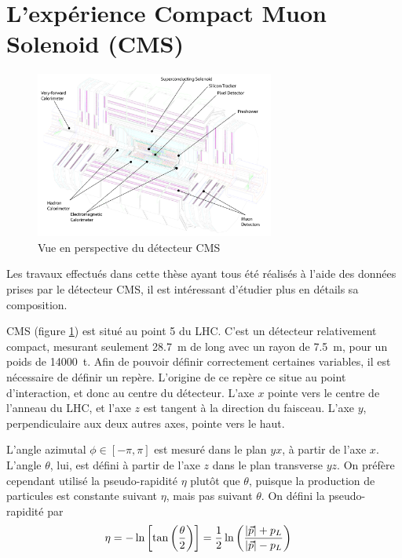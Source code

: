 % 

\section{L'expérience Compact Muon Solenoid (CMS)}

\begin{figure} \centering
  \includegraphics[width=0.7\textwidth]{chapitre2/figs/CMS_2.pdf}
  \caption{Vue en perspective du détecteur CMS}
  \label{fig:cms}
\end{figure}

Les travaux effectués dans cette thèse ayant tous été réalisés à l'aide des données prises par le détecteur CMS, il est intéressant d'étudier plus en détails sa composition.

\bigskip

CMS (figure \ref{fig:cms}) est situé au point 5 du LHC. C'est un détecteur relativement compact, mesurant seulement \SI{28.7}{\m} de long avec un rayon de \SI{7.5}{\m}, pour un poids de \SI{14000}{\tonne}. Afin de pouvoir définir correctement certaines variables, il est nécessaire de définir un repère. L'origine de ce repère ce situe au point d'interaction, et donc au centre du détecteur. L'axe $x$ pointe vers le centre de l'anneau du LHC, et l'axe $z$ est tangent à la direction du faisceau. L'axe $y$, perpendiculaire aux deux autres axes, pointe vers le haut.

L'angle azimutal $\phi \in \left[-\pi, \pi\right]$ est mesuré dans le plan $yx$, à partir de l'axe $x$. L'angle $\theta$, lui, est défini à partir de l'axe $z$ dans le plan transverse $yz$. On préfère cependant utilisé la pseudo-rapidité $\eta$ plutôt que $\theta$, puisque la production de particules est constante suivant $\eta$, mais pas suivant $\theta$. On défini la pseudo-rapidité par
\begin{align*}
  \eta &= -\ln\left[\tan\left(\frac{\theta}{2}\right)\right] = \frac{1}{2} \ln\left(\frac{\lvert \vec{p} \rvert + p_L}{\lvert \vec{p} \rvert - p_L}\right)
\end{align*}

